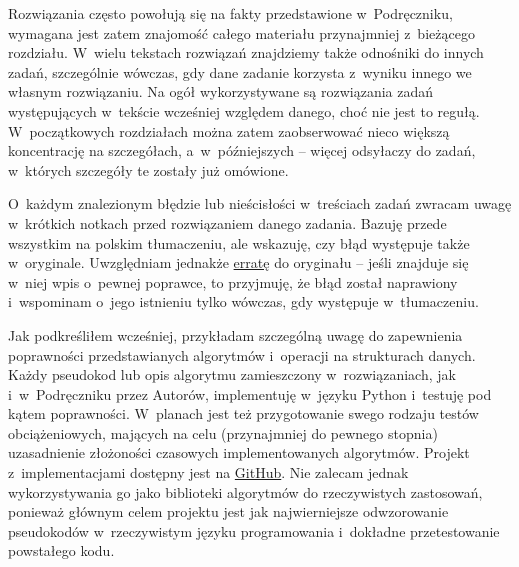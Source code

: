 Rozwiązania często powołują się na fakty przedstawione w~Podręczniku, wymagana jest zatem znajomość całego materiału przynajmniej z~bieżącego rozdziału.
W~wielu tekstach rozwiązań znajdziemy także odnośniki do innych zadań, szczególnie wówczas, gdy dane zadanie korzysta z~wyniku innego we własnym rozwiązaniu.
Na ogół wykorzystywane są rozwiązania zadań występujących w~tekście wcześniej względem danego, choć nie jest to regułą.
W~początkowych rozdziałach można zatem zaobserwować nieco większą koncentrację na szczegółach, a~w~późniejszych -- więcej odsyłaczy do zadań, w~których szczegóły te zostały już omówione.

O~każdym znalezionym błędzie lub nieścisłości w~treściach zadań zwracam uwagę w~krótkich notkach przed rozwiązaniem danego zadania.
Bazuję przede wszystkim na polskim tłumaczeniu, ale wskazuję, czy błąd występuje także w~oryginale.
Uwzględniam jednakże \href{http://www.cs.dartmouth.edu/~thc/clrs-2e-bugs/bugs.php}{erratę} do oryginału -- jeśli znajduje się w~niej wpis o~pewnej poprawce, to przyjmuję, że błąd został naprawiony i~wspominam o~jego istnieniu tylko wówczas, gdy występuje w~tłumaczeniu.

Jak podkreśliłem wcześniej, przykładam szczególną uwagę do zapewnienia poprawności przedstawianych algorytmów i~operacji na strukturach danych.
Każdy pseudokod lub opis algorytmu zamieszczony w~rozwiązaniach, jak i~w~Podręczniku przez Autorów, implementuję w~języku Python i~testuję pod kątem poprawności.
W~planach jest też przygotowanie swego rodzaju testów obciążeniowych, mających na celu (przynajmniej do pewnego stopnia) uzasadnienie złożoności czasowych implementowanych algorytmów.
Projekt z~implementacjami dostępny jest na \href{https://github.com/wojtask/CormenPy}{GitHub}.
Nie zalecam jednak wykorzystywania go jako biblioteki algorytmów do rzeczywistych zastosowań, ponieważ głównym celem projektu jest jak najwierniejsze odwzorowanie pseudokodów w~rzeczywistym języku programowania i~dokładne przetestowanie powstałego kodu.

